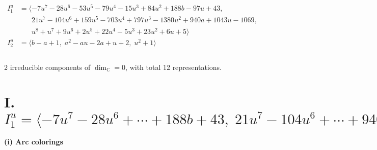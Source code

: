 \documentclass[1p]{elsarticle_modified}
\theoremstyle{definition}
\begin{document}
\begin{align*}
I^u_{1}&=\langle 
-7 u^7-28 u^6-53 u^5-79 u^4-15 u^3+84 u^2+188 b-97 u+43,\\
\phantom{I^u_{1}}&\phantom{= \langle  }21 u^7-104 u^6+159 u^5-703 u^4+797 u^3-1380 u^2+940 a+1043 u-1069,\\
\phantom{I^u_{1}}&\phantom{= \langle  }u^8+u^7+9 u^6+2 u^5+22 u^4-5 u^3+23 u^2+6 u+5\rangle \\
I^u_{2}&=\langle 
b- a+1,\;a^2- a u-2 a+u+2,\;u^2+1\rangle \\
\\
\end{align*}
\raggedright * 2 irreducible components of $\dim_{\mathbb{C}}=0$, with total 12 representations.\\
\newpage
\renewcommand{\arraystretch}{1}
\centering \section*{I. $I^u_{1}= \langle -7 u^7-28 u^6+\cdots+188 b+43,\;21 u^7-104 u^6+\cdots+940 a-1069,\;u^8+u^7+\cdots+6 u+5 \rangle$}
\flushleft \textbf{(i) Arc colorings}\\
\end{document}
